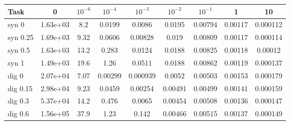\begin{tabular}{lcccccccc}\hline
Task & 0 & $10^{-6}$ & $10^{-4}$ & $10^{-3}$ & $10^{-2}$ & $10^{-1}$ & 1 & 10 \\ \hline
syn 0 & 1.63e+03 & 8.2 & 0.0199 & 0.0086 & 0.0195 & 0.00794 & 0.00117 & 0.000112 \\
syn 0.25 & 1.69e+03 & 9.32 & 0.0606 & 0.00828 & 0.019 & 0.00809 & 0.00117 & 0.000114 \\
syn 0.5 & 1.63e+03 & 13.2 & 0.283 & 0.0124 & 0.0188 & 0.00825 & 0.00118 & 0.00012 \\
syn 1 & 1.49e+03 & 19.6 & 1.26 & 0.0511 & 0.0188 & 0.00862 & 0.00119 & 0.000137 \\
dig 0 & 2.07e+04 & 7.07 & 0.00299 & 0.000939 & 0.0052 & 0.00503 & 0.00153 & 0.000179 \\
dig 0.15 & 2.98e+04 & 9.23 & 0.0459 & 0.00254 & 0.00491 & 0.00499 & 0.00141 & 0.000159 \\
dig 0.3 & 5.37e+04 & 14.2 & 0.476 & 0.0065 & 0.00454 & 0.00508 & 0.00136 & 0.000147 \\
dig 0.6 & 1.56e+05 & 37.9 & 1.23 & 0.142 & 0.00466 & 0.00515 & 0.00137 & 0.000149 \\
\hline\end{tabular}
